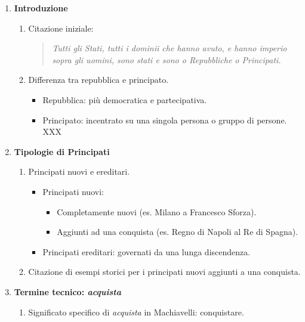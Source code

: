 \documentclass{article}
\begin{document}
\begin{enumerate}
    \item \textbf{Introduzione}
    \begin{enumerate}[label*=\arabic*.]
        \item Citazione iniziale:
        \begin{quote}
            \itshape
            Tutti gli Stati, tutti i dominii che hanno avuto, e hanno imperio sopra gli uomini, sono stati e sono o Repubbliche o Principati.
        \end{quote}
        \item Differenza tra repubblica e principato.
        \begin{itemize}
            \item Repubblica: più democratica e partecipativa.
            \item Principato: incentrato su una singola persona o gruppo di persone. XXX
        \end{itemize}
    \end{enumerate}

    \item \textbf{Tipologie di Principati}
    \begin{enumerate}[label*=\arabic*.]
        \item Principati nuovi e ereditari.
        \begin{itemize}
            \item Principati nuovi:
            \begin{itemize}
                \item Completamente nuovi (es. Milano a Francesco Sforza).
                \item Aggiunti ad una conquista (es. Regno di Napoli al Re di Spagna).
            \end{itemize}
            \item Principati ereditari: governati da una lunga discendenza.
        \end{itemize}
        \item Citazione di esempi storici per i principati nuovi aggiunti a una conquista.
    \end{enumerate}

    \item \textbf{Termine tecnico: \textit{acquista}}
    \begin{enumerate}[label*=\arabic*.]
        \item Significato specifico di \textit{acquista} in Machiavelli: conquistare.
    \end{enumerate}


\end{enumerate}
\end{document}

